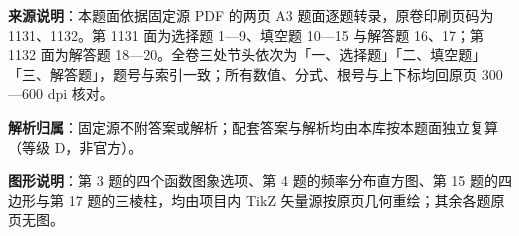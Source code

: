 

\begin{gknotice}
\textbf{来源说明}：本题面依据固定源 PDF 的两页 A3 题面逐题转录，原卷印刷页码为 1131、1132。第 1131 面为选择题 1—9、填空题 10—15 与解答题 16、17；第 1132 面为解答题 18—20。全卷三处节头依次为「一、选择题」「二、填空题」「三、解答题」，题号与索引一致；所有数值、分式、根号与上下标均回原页 300—600 dpi 核对。

\textbf{解析归属}：固定源不附答案或解析；配套答案与解析均由本库按本题面独立复算（等级 D，非官方）。

\textbf{图形说明}：第 3 题的四个函数图象选项、第 4 题的频率分布直方图、第 15 题的四边形与第 17 题的三棱柱，均由项目内 TikZ 矢量源按原页几何重绘；其余各题原页无图。
\end{gknotice}


